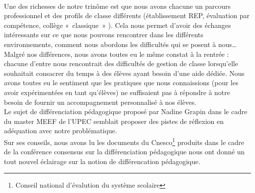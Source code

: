 \paragraph{} Une des richesses de notre trinôme est que nous avons chacune un parcours professionnel et des profils de classe différents (établissement REP, évaluation par compétence, collège « classique » ). Cela nous permet d'avoir des échanges intéressants sur ce que nous pouvons rencontrer dans les différents environnements, comment nous abordons les difficultés qui se posent à nous\ldots \\
Malgré nos différences, nous avons toutes eu le même constat à la rentrée : chacune d'entre nous rencontrait des difficultés de gestion de classe lorsqu'elle souhaitait consacrer du temps à des élèves ayant besoin d'une aide dédiée. Nous avons toutes eu le sentiment que les pratiques que nous connaissions (pour les avoir expérimentées en tant qu'élèves) ne suffisaient pas à répondre à notre besoin de fournir un accompagnement personnalisé à nos élèves.\\
Le sujet de différenciation pédagogique proposé par Nadine Grapin dans le cadre du master MEEF de l'UPEC semblait proposer des pistes de réflexion en adéquation avec notre problématique.\\
Sur ses conseils, nous avons lu les documents du Cnesco\footnote{Conseil national d'évalution du système scolaire} produits dans le cadre de la conférence consensus sur la différenciation pédagogique nous ont donné un tout nouvel éclairage sur la notion de différencation pédagogique.
